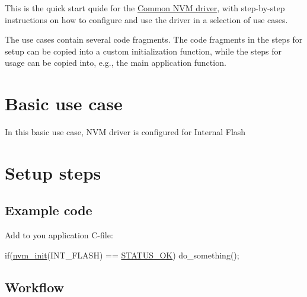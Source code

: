This is the quick start quide for the \hyperlink{group__nvm__group}{Common N\-V\-M driver}, with step-\/by-\/step instructions on how to configure and use the driver in a selection of use cases.

The use cases contain several code fragments. The code fragments in the steps for setup can be copied into a custom initialization function, while the steps for usage can be copied into, e.\-g., the main application function.\hypertarget{common_nvm_quickstart_nvm_basic_use_case}{}\section{Basic use case}\label{common_nvm_quickstart_nvm_basic_use_case}
In this basic use case, N\-V\-M driver is configured for Internal Flash\hypertarget{common_nvm_quickstart_nvm_basic_use_case_setup}{}\section{Setup steps}\label{common_nvm_quickstart_nvm_basic_use_case_setup}
\hypertarget{common_nvm_quickstart_nvm_basic_use_case_setup_code}{}\subsection{Example code}\label{common_nvm_quickstart_nvm_basic_use_case_setup_code}
Add to you application C-\/file\-: 
\begin{DoxyCode}
        \textcolor{keywordflow}{if}(\hyperlink{xmega__nvm_8c_a0ac16f4de49f2f0df16e3cf56be5f578}{nvm\_init}(INT\_FLASH) == \hyperlink{group__group__xmega__utils__status__codes_gga751c892e5a46b8e7d282085a5a5bf151a7e4a42e3b6dd63708c64cf3db6f69566}{STATUS\_OK})
          do\_something();
\end{DoxyCode}
\hypertarget{common_nvm_quickstart_nvm_basic_use_case_setup_flow}{}\subsection{Workflow}\label{common_nvm_quickstart_nvm_basic_use_case_setup_flow}

